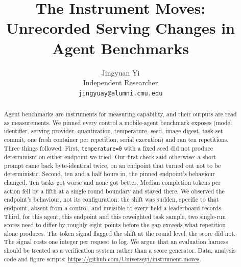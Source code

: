 \documentclass{article}
\title{The Instrument Moves: Unrecorded Serving Changes in Agent Benchmarks}
\author{Jingyuan Yi\\ Independent Researcher\\ \texttt{jingyuay@alumni.cmu.edu}}
\begin{document}
\maketitle

\begin{abstract}
Agent benchmarks are instruments for measuring capability, and their outputs are
read as measurements. We pinned every control a mobile-agent benchmark exposes
(model identifier, serving provider, quantization, temperature, seed, image
digest, task-set commit, one fresh container per repetition, serial execution)
and ran ten repetitions. Three things followed. First,
\texttt{temperature{=}0} with a fixed seed did not produce determinism on either
endpoint we tried. Our first check said otherwise: a short prompt came back
byte-identical twice, on an endpoint that turned out not to be deterministic.
Second, ten and a half hours in, the pinned endpoint's behaviour changed. Ten
tasks got worse and none got better. Median completion tokens per action fell
by a fifth at a single round boundary and stayed there. We observed the
endpoint's behaviour, not its configuration: the shift was sudden, specific to
that endpoint, absent from a control, and invisible to every field a
leaderboard records. Third, for this agent, this endpoint and this reweighted
task sample, two single-run scores need to differ by roughly eight points
before the gap exceeds what repetition alone produces. The token signal flagged
the shift at the round level; the score did not. The signal costs one integer
per request to log. We argue that an evaluation harness should be treated as a
verification system rather than a score generator. Data, analysis code and
figure scripts: \url{https://github.com/Universeyi/instrument-moves}.
\end{abstract}














\appendix

\end{document}
